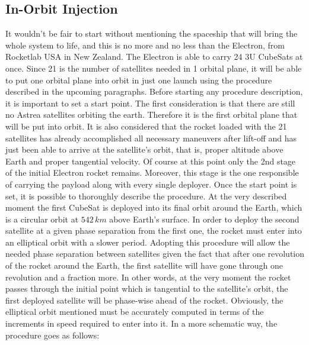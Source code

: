 \subsection{In-Orbit Injection}
It wouldn't be fair to start without mentioning the spaceship that will bring the whole system to life, and this is no more and no less than the Electron, from Rocketlab USA in New Zealand. The Electron is able to carry 24 3U CubeSats at once. Since 21 is the number of satellites needed in 1 orbital plane, it will be able to put one orbital plane into orbit in just one launch using the procedure described in the upcoming paragraphs.
\newline\newline
Before starting any procedure description, it is important to set a start point. The first consideration is that there are still no Astrea satellites orbiting the earth. Therefore it is the first orbital plane that will be put into orbit. It is also considered that the rocket loaded with the 21 satellites has already accomplished all necessary maneuvers after lift-off and has just been able to arrive at the satellite's orbit, that is, proper altitude above Earth and proper tangential velocity. Of course at this point only the 2nd stage of the initial Electron rocket remains. Moreover, this stage is the one responsible of carrying the payload along with every single deployer. Once the start point is set, it is possible to thoroughly describe the procedure.
\newline\newline
At the very described moment the first CubeSat is deployed into its final orbit around the Earth, which is a circular orbit at $542 \,km$ above Earth's surface. In order to deploy the second satellite at a given phase separation from the first one, the rocket must enter into an elliptical orbit with a slower period. Adopting this procedure will allow the needed phase separation between satellites given the fact that after one revolution of the rocket around the Earth, the first satellite will have gone through one revolution and a fraction more. In other words, at the very moment the rocket passes through the initial point which is tangential to the satellite's orbit, the first deployed satellite will be phase-wise ahead of the rocket. Obviously, the elliptical orbit mentioned must be accurately computed in terms of the increments in speed required to enter into it.
\newline\newline
In a more schematic way, the procedure goes as follows:
